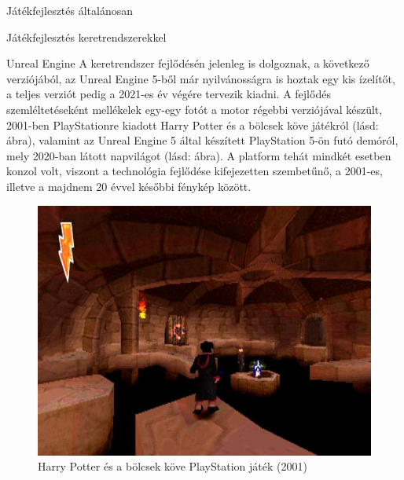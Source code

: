 \begin{MyChapter}{Játékfejlesztés általánosan}
\begin{MySection}{Játékfejlesztés keretrendszerekkel}
\begin{MySubSection}{Unreal Engine}
		A keretrendszer fejlődésén jelenleg is dolgoznak, a következő verziójából, az Unreal Engine 5-ből már nyilvánosságra is hoztak egy kis ízelítőt, a teljes verziót pedig a 2021-es év végére tervezik kiadni.
		A fejlődés szemléltetéseként mellékelek egy-egy fotót a motor régebbi verziójával készült, 2001-ben PlayStationre kiadott Harry Potter és a bölcsek köve játékról (lásd:  ábra), valamint az Unreal Engine 5 által készített PlayStation 5-ön futó demóról, mely 2020-ban látott napvilágot (lásd:  ábra). A platform tehát mindkét esetben konzol volt, viszont a technológia fejlődése kifejezetten szembetűnő, a 2001-es, illetve a majdnem 20 évvel későbbi fénykép között.
		\begin{figure}[h!]
			\centering
			\includegraphics[scale=0.4]{kepek/unrealEngine/harry-potter-and-the-sorcerer-s-stone-ps.jpeg}
			\caption{Harry Potter és a bölcsek köve PlayStation játék (2001)}
			\label{fig:unrealEngine:harry-potter-and-the-sorcerer-s-stone-ps}
		\end{figure}
		\begin{figure}[h!]
			\centering

\end{figure}
\end{MySubSection}
\end{MySection}
\end{MyChapter}
